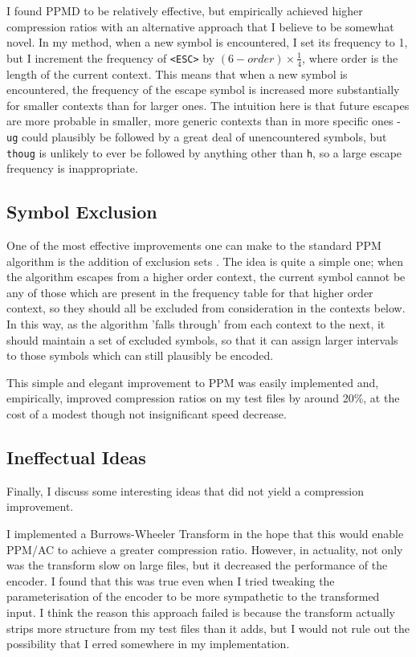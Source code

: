 \documentclass[11pt]{article}
\newcommand{\code}[1]{\texttt{#1}}
\begin{document}
I found PPMD to be relatively effective, but empirically achieved higher compression ratios with an alternative approach that I believe to be somewhat novel. In my method, when a new symbol is encountered, I set its frequency to 1, but I increment the frequency of \code{<ESC>} by $(6 - order) \times \frac{1}{4}$, where order is the length of the current context. This means that when a new symbol is encountered, the frequency of the escape symbol is increased more substantially for smaller contexts than for larger ones. The intuition here is that future escapes are more probable in smaller, more generic contexts than in more specific ones - \code{ug} could plausibly be followed by a great deal of unencountered symbols, but \code{thoug} is unlikely to ever be followed by anything other than \code{h}, so a large escape frequency is inappropriate.

\subsection{Symbol Exclusion}

One of the most effective improvements one can make to the standard PPM algorithm is the addition of exclusion sets \cite{steinruecken2015lossless}. The idea is quite a simple one; when the algorithm escapes from a higher order context, the current symbol cannot be any of those which are present in the frequency table for that higher order context, so they should all be excluded from consideration in the contexts below. In this way, as the algorithm 'falls through' from each context to the next, it should maintain a set of excluded symbols, so that it can assign larger intervals to those symbols which can still plausibly be encoded.

This simple and elegant improvement to PPM was easily implemented and, empirically, improved compression ratios on my test files by around 20\%, at the cost of a modest though not insignificant speed decrease.

\subsection{Ineffectual Ideas}

Finally, I discuss some interesting ideas that did not yield a compression improvement.

I implemented a Burrows-Wheeler Transform in the hope that this would enable PPM/AC to achieve a greater compression ratio. However, in actuality, not only was the transform slow on large files, but it decreased the performance of the encoder. I found that this was true even when I tried tweaking the parameterisation of the encoder to be more sympathetic to the transformed input. I think the reason this approach failed is because the transform actually strips more structure from my test files than it adds, but I would not rule out the possibility that I erred somewhere in my implementation.
\end{document}
